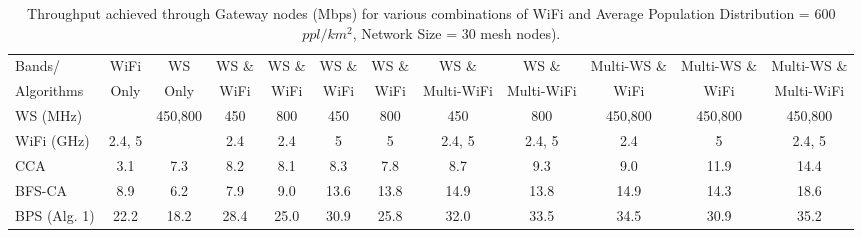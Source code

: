 \begin{table}
\centering %
\begin{tabular}{|l|c|c|c|c|c|c|c|c|c|c|c|} %
\hline %
Bands/     & WiFi    & WS      & WS \& & WS \& &  WS \& & WS \& & WS \&      &  WS \&      & Multi-WS \& & Multi-WS \& & Multi-WS \& \\%
Algorithms & Only    & Only    & WiFi  & WiFi  &  WiFi  & WiFi  & Multi-WiFi &  Multi-WiFi & WiFi        & WiFi        & Multi-WiFi  \\
\hline %
WS (MHz)   &                                                        & 450,800 & 450 &  800  &  450   & 800               & 450    & 800      & 450,800     & 450,800     & 450,800     \\
\hline
WiFi (GHz) & 2.4, 5 &                                                             & 2.4 &  2.4  &  5   & 5               & 2.4, 5& 2.4, 5        & 2.4             & 5         & 2.4, 5     \\ %
\hline
\hline %
CCA~\cite{draves2004routing}                        & 3.1   &  7.3  & 8.2    &8.1    &8.3                &7.8     &   8.7    &   9.3&     9.0             &         11.9     &   14.4          \\      
\hline %
BFS-CA~\cite{ramachandran2006interference}  & 8.9   &  6.2  & 7.9    & 9.0   & 13.6       & 13.8   &  14.9    &   13.8&      14.9           &      14.3       &       18.6      \\      
\hline %
BPS (Alg. 1)                                                            & 22.2  & 18.2  &  28.4  & 25.0  & 30.9          & 25.8   &   32.0  &  33.5       &     34.5            &      30.9       &       35.2      \\      
\hline %
\end{tabular}    
\caption{Throughput achieved through Gateway nodes (Mbps) for various combinations of WiFi and Average Population Distribution = 600 $ppl/km^2$, Network Size = 30 mesh nodes).} %
\label{tab:2channelcombination}    
\vspace{-0.4in}
\end{table}    

